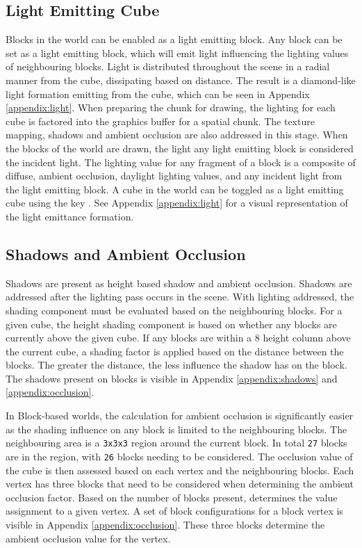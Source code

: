\documentclass[a4paper,11pt,titlepage]{scrartcl}
\begin{document}
\subsection{Light Emitting Cube}
\label{section:lights}
Blocks in the world can be enabled as a light emitting block. Any block can be set as a light emitting block, which will emit light influencing the lighting values of neighbouring blocks. Light is distributed throughout the scene in a radial manner from the cube, dissipating based on distance. The result is a diamond-like light formation emitting from the cube, which can be seen in Appendix \ref{appendix:light}. When preparing the chunk for drawing, the lighting for each cube is factored into the graphics buffer for a spatial chunk. The texture mapping, shadows and ambient occlusion are also addressed in this stage. When the blocks of the world are drawn, the light any light emitting block is considered the incident light. The lighting value for any fragment of a block is a composite of diffuse, ambient occlusion, daylight lighting values, and any incident light from the light emitting block. 
\vskip 2.5mm\noindent
A cube in the world can be toggled as a light emitting cube using the key . See Appendix \ref{appendix:light} for a visual representation of the light emittance formation.
    
\subsection{Shadows and Ambient Occlusion}
\label{section:shadows}
Shadows are present as height based shadow and ambient occlusion. Shadows are addressed after the lighting pass occurs in the scene. With lighting addressed, the shading component must be evaluated based on the neighbouring blocks. For a given cube, the height shading component is based on whether any blocks are currently above the given cube. If any blocks are within a $8$ height column above the current cube, a shading factor is applied based on the distance between the blocks. The greater the distance, the less influence the shadow has on the block. The shadows present on blocks is visible in Appendix \ref{appendix:shadows} and \ref{appendix:occlusion}.

In Block-based worlds, the calculation for ambient occlusion is significantly easier as the shading influence on any block is limited to the neighbouring blocks. The neighbouring area is a \texttt{3x3x3} region around the current block. In total \texttt{27} blocks are in the region, with \texttt{26} blocks needing to be considered. The occlusion value of the cube is then assessed based on each vertex and the neighbouring blocks. Each vertex has three blocks that need to be considered when determining the ambient occlusion factor. Based on the number of blocks present, determines the value assignment to a given vertex. A set of block configurations for a block vertex is visible in Appendix \ref{appendix:occlusion}. These three blocks determine the ambient occlusion value for the vertex.
\end{document}
